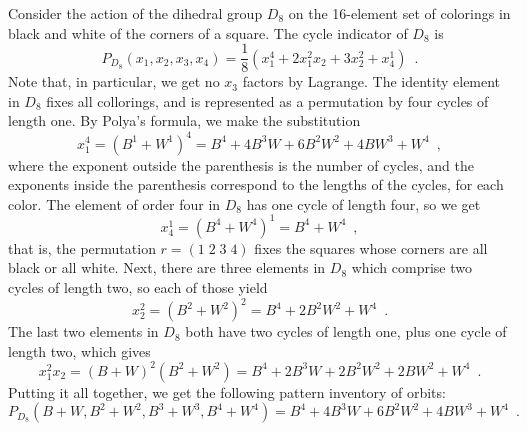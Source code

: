 \begin{example}
	\cite[249]{Tucker1974}
	Consider the action of the dihedral group $D_8$ on the 16-element set of colorings in
	black and white of the corners of a square. The cycle indicator of $D_8$ is
	\begin{equation}
		P_{D_8}(x_1, x_2, x_3, x_4) =
		\frac{1}{8}(x_1^4 + 2x_1^2x_2 + 3x_2^2 + x_4^1) \enspace.
	\end{equation}
	Note that, in particular, we get no $x_3$ factors by Lagrange. The identity element
	in $D_8$ fixes all collorings, and is represented as a permutation by four cycles
	of length one. By Polya's formula, we make the substitution
	\begin{equation}
		x_1^4 = (B^1 + W^1)^4 = B^4 + 4 B^3 W + 6 B^2 W^2 + 4 B W^3 + W^4 \enspace,
	\end{equation}
	where the exponent outside the parenthesis is the number of cycles, and the exponents
	inside the parenthesis correspond to the lengths of the cycles, for each color.
	The element of order four in $D_8$ has one cycle of length four, so we get
	\begin{equation}
		x_4^1 = (B^4 + W^4)^1 = B^4 + W^4 \enspace,
	\end{equation}
	that is, the permutation $r = (1 \; 2 \; 3 \; 4)$ fixes the squares whose corners are
	all black or all white. Next, there are three elements in $D_8$ which comprise
	two cycles of length two, so each of those yield
	\begin{equation}
		x_2^2 = (B^2 + W^2)^2 = B^4 + 2 B^2 W^2 + W^4 \enspace.
	\end{equation}
	The last two elements in $D_8$ both have two cycles of length one, plus one cycle
	of length two, which gives
	\begin{equation}
		x_1^2x_2 = (B + W)^2 (B^2 + W^2) =
		B^4 + 2 B^3 W + 2 B^2 W^2 + 2 B W^2 + W^4 \enspace.
	\end{equation}
	Putting it all together, we get the following pattern inventory of orbits:
	\begin{equation}
		P_{D_8}(B + W, B^2 + W^2, B^3 + W^3, B^4 + W^4) =
		B^4 + 4 B^3 W + 6 B^2 W^2 + 4 B W^3 + W^4 \enspace.
	\end{equation}
\end{example}
